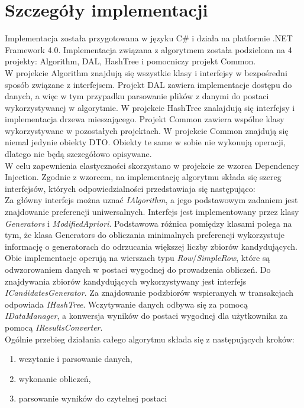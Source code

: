 \documentclass[a4paper,12pt]{article}
\begin{document}
\section{Szczegóły implementacji}

Implementacja została przygotowana w języku C\# i działa na platformie .NET Framework 4.0. Implementacja związana z algorytmem została podzielona na 4 projekty: Algorithm, DAL, HashTree i pomocniczy projekt Common.\\

W projekcie Algorithm znajdują się wszystkie klasy i interfejsy w bezpośredni sposób związane z interfejsem. Projekt DAL zawiera implementacje dostępu do danych, a więc w tym przypadku parsowanie plików z danymi do postaci wykorzystywanej w algorytmie. W projekcie HashTree znalajdują się interfejsy i implementacja drzewa mieszającego. Projekt Common zawiera wspólne klasy wykorzystywane w pozostałych projektach. W projekcie Common znajdują się niemal jedynie obiekty DTO. Obiekty te same w sobie nie wykonują operacji, dlatego nie będą szczegółowo opisywane.\\

W celu zapewnienia elastyczności skorzystano w projekcie ze wzorca Dependency Injection. Zgodnie z wzorcem, na implementację algorytmu składa się szereg interfejsów, których odpowiedzialności przedstawiaja się następująco:\\

Za główny interfejs można uznać \textit{IAlgorithm}, a jego podstawowym zadaniem jest znajdowanie preferencji uniwersalnych. Interfejs jest implementowany przez klasy \textit{Generators} i \textit{ModifiedApriori}. Podstawowa różnica pomiędzy klasami polega na tym, że klasa Generators do obliczania minimalnych preferencji wykorzystuje informację o generatorach do odrzucania większej liczby zbiorów kandydujących. Obie implementacje operują na wierszach
typu \textit{Row}/\textit{SimpleRow}, które są odwzorowaniem danych w postaci wygodnej do prowadzenia obliczeń. Do znajdywania zbiorów kandydujących wykorzystywany jest interfejs \textit{ICandidatesGenerator}. Za znajdowanie podzbiorów wspieranych w transakcjach odpowiada \textit{IHashTree}. Wczytywanie danych odbywa się za pomocą \textit{IDataManager}, a konwersja wyników do postaci wygodnej dla użytkownika za pomocą \textit{IResultsConverter}.\\

Ogólnie przebieg działania całego algorytmu składa się z następujących kroków:

\begin{enumerate}
\item wczytanie i parsowanie danych,
\item wykonanie obliczeń,
\item parsowanie wyników do czytelnej postaci
\end{enumerate}
\end{document}
